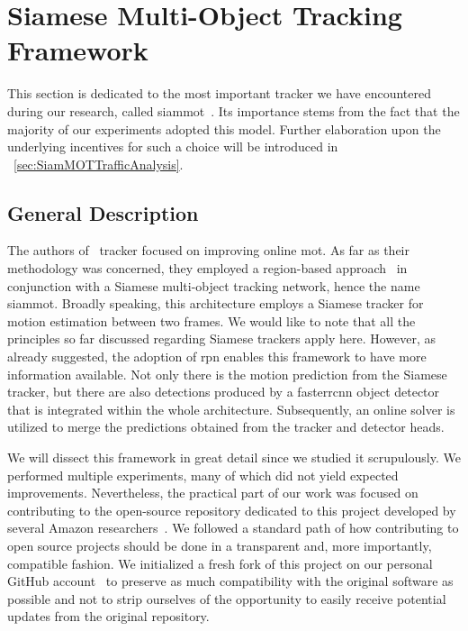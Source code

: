 \section{Siamese Multi-Object Tracking Framework}
\label{sec:SiamMOT}

This section is dedicated to the most important tracker we have encountered during our research, called \gls{siammot}~\cite{shuai2021siammot}. Its importance stems from the fact that the majority of our experiments adopted this model. Further elaboration upon the underlying incentives for such a choice will be introduced in \sectiontext{}~\ref{sec:SiamMOTTrafficAnalysis}.

\subsection{General Description}

The authors of~\cite{shuai2021siammot} tracker focused on improving online \gls{mot}. As far as their methodology was concerned, they employed a region-based approach~\cite{ren2017fasterrcnn} in conjunction with a Siamese multi-object tracking network, hence the name \gls{siammot}. Broadly speaking, this architecture employs a Siamese tracker for motion estimation between two frames. We would like to note that all the principles so far discussed regarding Siamese trackers apply here. However, as already suggested, the adoption of \gls{rpn} enables this framework to have more information available. Not only there is the motion prediction from the Siamese tracker, but there are also detections produced by a \gls{fasterrcnn} object detector~\cite{ren2017fasterrcnn} that is integrated within the whole architecture. Subsequently, an online solver is utilized to merge the predictions obtained from the tracker and detector heads.

We will dissect this framework in great detail since we studied it scrupulously. We performed multiple experiments, many of which did not yield expected improvements. Nevertheless, the practical part of our work was focused on contributing to the open-source repository dedicated to this project developed by several Amazon researchers~\cite{websiammotoriggithub}. We followed a standard path of how contributing to open source projects should be done in a transparent and, more importantly, compatible fashion. We initialized a fresh fork of this project on our personal GitHub account~\cite{websiammotforkgithub} to preserve as much compatibility with the original software as possible and not to strip ourselves of the opportunity to easily receive potential updates from the original repository.

